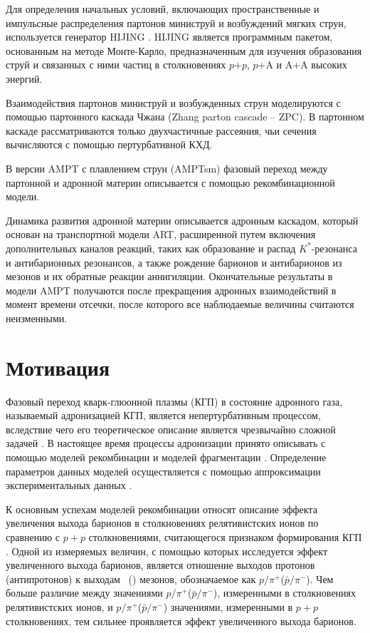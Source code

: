 Для определения начальных условий, включающих пространственные и импульсные распределения партонов министруй и возбуждений мягких струн, используется генератор HIJING \cite{HIJING}. HIJING является программным пакетом, основанным на методе Монте-Карло, предназначенным для изучения образования струй и связанных с ними частиц в столкновениях $p$+$p$, $p$+A и A+A высоких энергий.
 
Взаимодействия партонов министруй и возбужденных струн моделируются с помощью партонного каскада Чжана (Zhang parton cascade -- ZPC). В партонном каскаде рассматриваются только двухчастичные рассеяния, чьи сечения вычисляются с помощью пертурбативной КХД. 

В версии AMPT с плавлением струн (AMPTsm) фазовый переход между партонной и адронной материи описывается с помощью рекомбинационной модели. 

Динамика развития адронной материи описывается адронным каскадом, который основан на транспортной модели ART, расширенной путем включения дополнительных каналов реакций, таких как образование и распад $K^*$-резонанса и антибарионных резонансов, а также рождение барионов и антибарионов из мезонов и их обратные реакции аннигиляции. 
Окончательные результаты в модели AMPT получаются после прекращения адронных взаимодействий в момент времени отсечки, после которого все наблюдаемые величины считаются неизменными.  


\section{Мотивация}
Фазовый переход кварк-глюонной плазмы (КГП) \cite{QGP} в состояние адронного газа, называемый адронизацией КГП, является непертурбативным процессом, вследствие чего его теоретическое описание является чрезвычайно сложной задачей \cite{Coalescence_models}. В настоящее время процессы адронизации принято описывать с помощью моделей рекомбинации \cite{Coalescence_models, Recombination1, Recombination2} и моделей фрагментации \cite{FragmentationLund}. Определение параметров данных моделей осуществляется с помощью аппроксимации экспериментальных данных \cite{Coalescence_models, AMPT}. 

К основным успехам моделей рекомбинации относят описание эффекта увеличения выхода барионов в столкновениях релятивистских ионов по сравнению с $p+p$ столкновениями, считающегося признаком формирования КГП \cite{p2piRatio_130GeV, p2piRatio_2003}. Одной из измеряемых величин, с помощью которых исследуется эффект увеличенного выхода барионов, является отношение выходов протонов (антипротонов) к выходам  \pip \ (\pim) мезонов, обозначаемое как  $p/\pi^{+}$($\bar{p}/\pi^{-}$). Чем больше различие между значениями $p/\pi^{+}$($\bar{p}/\pi^{-}$), измеренными в столкновениях релятивистских ионов, и  $p/\pi^{+}$($\bar{p}/\pi^{-}$) значениями, измеренными в $p+p$ столкновениях, тем сильнее проявляется эффект увеличенного выхода барионов. 


